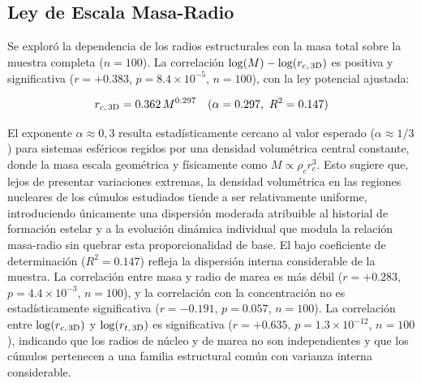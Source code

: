         \subsection{Ley de Escala Masa-Radio}
            Se exploró la dependencia de los radios estructurales con la masa 
            total sobre la muestra completa ($n = 100$). La correlación 
            $\log(M)-\log(r_{c,\, 3{\rm D}})$ es positiva y significativa 
            ($r = +0.383$, $p = 8.4 \times 10^{-5}$, $n = 100$), con la ley 
            potencial ajustada: 

            $$r_{c,\, 3{\rm D}} = 0.362\, M^{0.297} \quad (\alpha = 0.297,\ R^2 
            = 0.147)$$

            El exponente $\alpha \approx 0,3$ resulta estadísticamente cercano 
            al valor esperado ($\alpha \approx 1/3$) para sistemas esféricos 
            regidos por una densidad volumétrica central constante, donde la 
            masa escala geométrica y físicamente como $M \propto \rho_c r_c^3$. 
            Esto sugiere que, lejos de presentar variaciones extremas, la 
            densidad volumétrica en las regiones nucleares de los cúmulos 
            estudiados tiende a ser relativamente uniforme, introduciendo 
            únicamente una dispersión moderada atribuible al historial de 
            formación estelar y a la evolución dinámica individual que modula 
            la relación masa-radio sin quebrar esta proporcionalidad de base. 
            El bajo coeficiente de determinación ($R^2 = 0.147$) refleja la 
            dispersión interna considerable de la muestra. La correlación entre 
            masa y radio de marea es más débil ($r = +0.283$, 
            $p = 4.4 \times 10^{-3}$, $n = 100$), y la correlación con la 
            concentración no es estadísticamente significativa ($r = -0.191$, 
            $p = 0.057$, $n = 100$). La correlación entre 
            $\log(r_{c,\, 3{\rm D}})$ y $\log(r_{t,\, 3{\rm D}})$ es 
            significativa ($r = +0.635$, $p = 1.3 \times 10^{-12}$, $n = 100$), 
            indicando que los radios de núcleo y de marea no son independientes 
            y que los cúmulos pertenecen a una familia estructural común con 
            varianza interna considerable.

